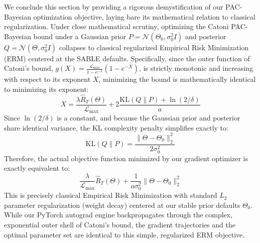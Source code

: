 We conclude this section by providing a rigorous demystification of our PAC-Bayesian optimization objective, laying bare its mathematical relation to classical regularization. Under close mathematical scrutiny, optimizing the Catoni PAC-Bayesian bound under a Gaussian prior $P = \mathcal{N}(\Theta_0, \sigma_0^2 I)$ and posterior $Q = \mathcal{N}(\Theta, \sigma_0^2 I)$ collapses to classical regularized Empirical Risk Minimization (ERM) centered at the SABLE defaults. Specifically, since the outer function of Catoni's bound, $g(X) = \frac{\mathcal{L}_{\max}}{1 - e^{-\lambda}} (1 - e^{-X})$, is strictly monotonic and increasing with respect to its exponent $X$, minimizing the bound is mathematically identical to minimizing its exponent:
\begin{equation}
    X = \frac{\lambda \hat{R}_T(\Theta)}{\mathcal{L}_{\max}} + 2 \frac{\text{KL}(Q \| P) + \ln(2/\delta)}{a}
\end{equation}
Since $\ln(2/\delta)$ is a constant, and because the Gaussian prior and posterior share identical variance, the KL complexity penalty simplifies exactly to:
\begin{equation}
    \text{KL}(Q \| P) = \frac{\|\Theta - \Theta_0\|_2^2}{2 \sigma_0^2}
\end{equation}
Therefore, the actual objective function minimized by our gradient optimizer is exactly equivalent to:
\begin{equation}
    \frac{\lambda}{\mathcal{L}_{\max}} \hat{R}_T(\Theta) + \frac{1}{a \sigma_0^2} \|\Theta - \Theta_0\|_2^2
\end{equation}
This is precisely classical Empirical Risk Minimization with standard $L_2$ parameter regularization (weight decay) centered at our stable prior defaults $\Theta_0$. While our PyTorch autograd engine backpropagates through the complex, exponential outer shell of Catoni's bound, the gradient trajectories and the optimal parameter set are identical to this simple, regularized ERM objective. 

